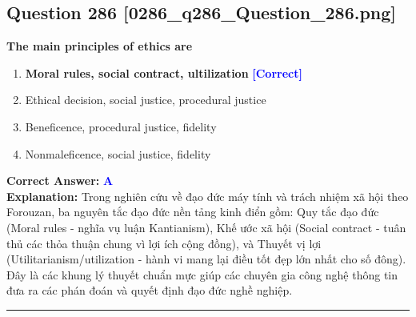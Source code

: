 \documentclass[11pt,a4paper]{article}
\begin{document}
\begin{minipage}{\textwidth}
\subsection*{Question 286 \quad \footnotesize{[0286\_q286\_Question\_286.png]}}
\noindent \textbf{The main principles of ethics are}

\begin{enumerate}[label=\Alph*.]
    \item \textbf{Moral rules, social contract, ultilization} \hfill \textcolor{blue}{\textbf{[Correct]}}
    \item Ethical decision, social justice, procedural justice
    \item Beneficence, procedural justice, fidelity
    \item Nonmaleficence, social justice, fidelity
\end{enumerate}

\noindent \textbf{Correct Answer:} \textcolor{blue}{\textbf{A}} \\[2pt]
\noindent \textbf{Explanation:} Trong nghiên cứu về đạo đức máy tính và trách nhiệm xã hội theo Forouzan, ba nguyên tắc đạo đức nền tảng kinh điển gồm: Quy tắc đạo đức (Moral rules - nghĩa vụ luận Kantianism), Khế ước xã hội (Social contract - tuân thủ các thỏa thuận chung vì lợi ích cộng đồng), và Thuyết vị lợi (Utilitarianism/utilization - hành vi mang lại điều tốt đẹp lớn nhất cho số đông). Đây là các khung lý thuyết chuẩn mực giúp các chuyên gia công nghệ thông tin đưa ra các phán đoán và quyết định đạo đức nghề nghiệp.

\par\vspace{0.3cm}
\hrule
\vspace{0.3cm}
\end{minipage}
\end{document}
